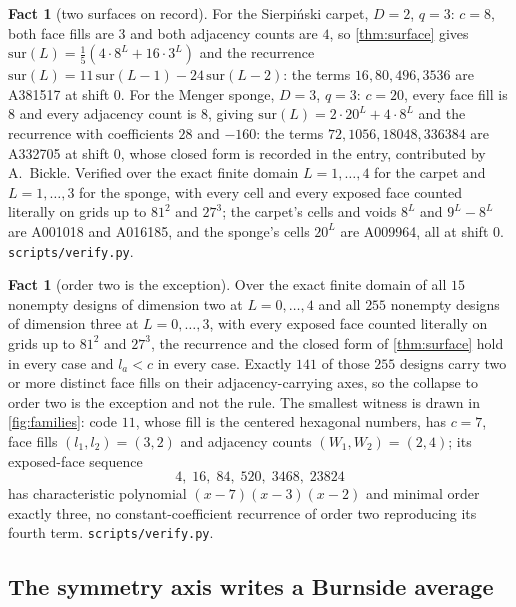 \documentclass[11pt]{amsart}
\theoremstyle{definition}
\newtheorem{fact}[theorem]{Fact}
\theoremstyle{remark}
\begin{document}
\begin{fact}[two surfaces on record]
\label{fact:surface}
For the Sierpi\'nski carpet, $D=2$, $q=3$: $c=8$, both face fills are $3$ and both adjacency counts are $4$, so \cref{thm:surface} gives $\mathrm{sur}(L) = \tfrac{1}{5}(4\cdot 8^{L}+16\cdot 3^{L})$ and the recurrence $\mathrm{sur}(L) = 11\,\mathrm{sur}(L-1)-24\,\mathrm{sur}(L-2)$: the terms $16, 80, 496, 3536$ are A381517 at shift $0$. For the Menger sponge, $D=3$, $q=3$: $c=20$, every face fill is $8$ and every adjacency count is $8$, giving $\mathrm{sur}(L) = 2\cdot 20^{L}+4\cdot 8^{L}$ and the recurrence with coefficients $28$ and $-160$: the terms $72, 1056, 18048, 336384$ are A332705 at shift $0$, whose closed form is recorded in the entry, contributed by A.~Bickle. Verified over the exact finite domain $L = 1,\dots,4$ for the carpet and $L=1,\dots,3$ for the sponge, with every cell and every exposed face counted literally on grids up to $81^{2}$ and $27^{3}$; the carpet's cells and voids $8^{L}$ and $9^{L}-8^{L}$ are A001018 and A016185, and the sponge's cells $20^{L}$ are A009964, all at shift $0$. \texttt{scripts/\allowbreak verify.py}.
\end{fact}

\begin{fact}[order two is the exception]
\label{fact:sharp}
Over the exact finite domain of all $15$ nonempty designs of dimension two at $L = 0,\dots,4$ and all $255$ nonempty designs of dimension three at $L = 0,\dots,3$, with every exposed face counted literally on grids up to $81^{2}$ and $27^{3}$, the recurrence and the closed form of \cref{thm:surface} hold in every case and $l_{a} < c$ in every case. Exactly $141$ of those $255$ designs carry two or more distinct face fills on their adjacency-carrying axes, so the collapse to order two is the exception and not the rule. The smallest witness is drawn in \cref{fig:families}: code $11$, whose fill is the centered hexagonal numbers, has $c = 7$, face fills $(l_{1},l_{2}) = (3,2)$ and adjacency counts $(W_{1},W_{2}) = (2,4)$; its exposed-face sequence
\[
  4,\; 16,\; 84,\; 520,\; 3468,\; 23824
\]
has characteristic polynomial $(x-7)(x-3)(x-2)$ and minimal order exactly three, no constant-coefficient recurrence of order two reproducing its fourth term. \texttt{scripts/\allowbreak verify.py}.
\end{fact}

\subsection*{The symmetry axis writes a Burnside average}
\end{document}
